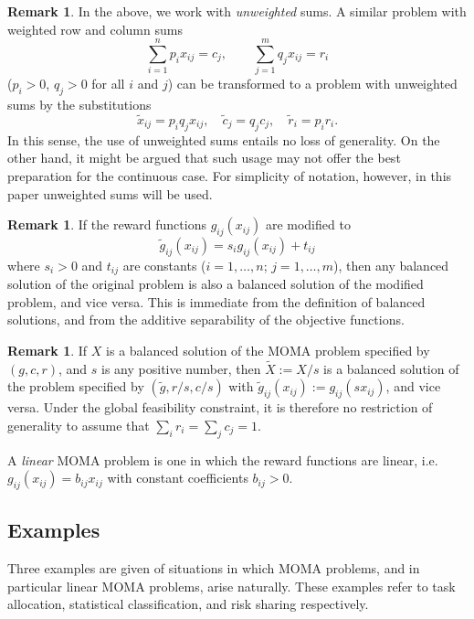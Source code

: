 \documentclass{article}
\theoremstyle{definition}
\newtheorem{remark}[theorem]{Remark}
\begin{document}
\begin{remark}
In the above, we work with \emph{unweighted} sums. A similar problem with weighted row and column sums
$$
\sum_{i=1}^n p_i x_{ij} = c_j , \qquad \sum_{j=1}^m q_j x_{ij} = r_i
$$
($p_i > 0$, $q_j > 0$ for all $i$ and $j$) can be transformed to a problem with unweighted sums by the substitutions
$$
\tilde{x}_{ij} = p_i q_j x_{ij}, \quad \tilde{c}_j = q_j c_j, \quad \tilde{r}_i = p_i r_i.
$$
In this sense, the use of unweighted sums entails no loss of generality. On the other hand, it might be argued that such usage may not offer the best preparation for the continuous case. For simplicity of notation, however, in this paper unweighted sums will be used.
\end{remark}

\begin{remark} \label{inv}
If the reward functions $g_{ij}(x_{ij})$ are modified to
$$
\tilde{g}_{ij}(x_{ij}) = s_i g_{ij}(x_{ij}) + t_{ij}
$$
where $s_i > 0$ and $t_{ij}$ are constants ($i=1,\dots,n$; $j=1,\dots,m$), then any balanced solution of the original problem is also a balanced solution of the modified problem, and vice versa. This is immediate from the definition of balanced solutions, and from the additive separability of the objective functions.
\end{remark}

\begin{remark}
If $X$ is a balanced solution of the MOMA problem specified by $(g,c,r)$, and $s$ is any positive number, then $\tilde{X} := X/s$ is a balanced solution of the problem specified by $(\tilde{g},r/s,c/s)$ with $\tilde{g}_{ij}(x_{ij}):=g_{ij}(sx_{ij})$, and vice versa.
Under the global feasibility constraint, it is therefore no restriction of generality to assume that $\sum_i r_i = \sum_j c_j = 1$.
\end{remark}

A \emph{linear} MOMA problem is one in which the reward functions are linear, i.e.\ $g_{ij}(x_{ij}) = b_{ij}x_{ij}$ with constant coefficients $b_{ij}>0$.

\subsection{Examples} \label{examples}

Three examples are given of situations in which MOMA problems, and in particular linear MOMA problems, arise naturally. These examples refer to task allocation, statistical classification, and risk sharing respectively.
\end{document}
